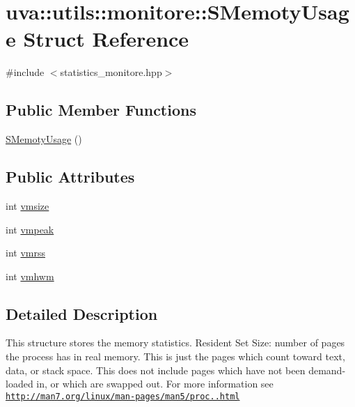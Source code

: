\hypertarget{structuva_1_1utils_1_1monitore_1_1_s_memoty_usage}{}\section{uva\+:\+:utils\+:\+:monitore\+:\+:S\+Memoty\+Usage Struct Reference}
\label{structuva_1_1utils_1_1monitore_1_1_s_memoty_usage}


{\ttfamily \#include $<$statistics\+\_\+monitore.\+hpp$>$}

\subsection*{Public Member Functions}
\begin{DoxyCompactItemize}
\item 
\hyperlink{structuva_1_1utils_1_1monitore_1_1_s_memoty_usage_af554a4f07f2e438c81852aca39e24b92}{S\+Memoty\+Usage} ()
\end{DoxyCompactItemize}
\subsection*{Public Attributes}
\begin{DoxyCompactItemize}
\item 
int \hyperlink{structuva_1_1utils_1_1monitore_1_1_s_memoty_usage_adaa0855e2993c6364c8b5891e63dbff4}{vmsize}
\item 
int \hyperlink{structuva_1_1utils_1_1monitore_1_1_s_memoty_usage_a8242cff8c7bf0ca9c340562eff5e2e97}{vmpeak}
\item 
int \hyperlink{structuva_1_1utils_1_1monitore_1_1_s_memoty_usage_a9113a20622f78f89e697550039291c20}{vmrss}
\item 
int \hyperlink{structuva_1_1utils_1_1monitore_1_1_s_memoty_usage_afb6385728411b50c07d8a8971ebc077d}{vmhwm}
\end{DoxyCompactItemize}


\subsection{Detailed Description}
This structure stores the memory statistics. Resident Set Size\+: number of pages the process has in real memory. This is just the pages which count toward text, data, or stack space. This does not include pages which have not been demand-\/loaded in, or which are swapped out. For more information see \href{http://man7.org/linux/man-pages/man5/proc.5.html}{\tt http\+://man7.\+org/linux/man-\/pages/man5/proc..\+html} 

